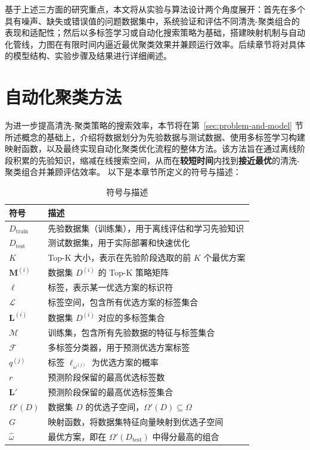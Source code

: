 \documentclass[10pt]{article} %
\numberwithin{equation}{section}
\begin{document}
基于上述三方面的研究重点，本文将从实验与算法设计两个角度展开：首先在多个具有噪声、缺失或错误值的问题数据集中，系统验证和评估不同清洗-聚类组合的表现和适配性；然后以多标签学习或自动化搜索策略为基础，搭建映射机制与自动化管线，力图在有限时间内逼近最优聚类效果并兼顾运行效率。后续章节将对具体的模型结构、实验步骤及结果进行详细阐述。


\section{自动化聚类方法}
\label{sec:autoML}

为进一步提高清洗-聚类策略的搜索效率，本节将在第~\ref{sec:problem-and-model} 节所述概念的基础上，介绍将数据划分为先验数据与测试数据、使用多标签学习构建映射函数，以及最终实现自动化聚类优化流程的整体方法。该方法旨在通过离线阶段积累的先验知识，缩减在线搜索空间，从而在\textbf{较短时间}内找到\textbf{接近最优}的清洗-聚类组合并兼顾评估效率。
以下是本章节所定义的符号与描述：

\begin{table}[ht]
\centering
\small %
\renewcommand{\arraystretch}{1.1} %
\label{tab:symbols-advanced}
\begin{tabular}{ll}
\toprule
\textbf{符号} & \textbf{描述} \\
\midrule
$D_{\text{train}}$ & 先验数据集（训练集），用于离线评估和学习先验知识 \\
$D_{\text{test}}$ & 测试数据集，用于实际部署和快速优化 \\
$K$ & Top-K 大小，表示在先验阶段选取的前 $K$ 个最优方案 \\
$\mathbf{M}^{(i)}$ & 数据集 $D^{(i)}$ 的 Top-K 策略矩阵 \\
$\ell$ & 标签，表示某一优选方案的标识符 \\
$\mathcal{L}$ & 标签空间，包含所有优选方案的标签集合 \\
$\mathbf{L}^{(i)}$ & 数据集 $D^{(i)}$ 对应的多标签集合 \\
$\mathcal{M}$ & 训练集，包含所有先验数据的特征与标签集合 \\
$\mathcal{F}$ & 多标签分类器，用于预测优选方案标签 \\
$q^{(j)}$ & 标签 $\ell_{\omega^{(j)}}$ 为优选方案的概率 \\
$r$ & 预测阶段保留的最高优选标签数 \\
$\mathbf{L}'$ & 预测阶段保留的最高优选标签集合 \\
$\Omega'(D)$ & 数据集 $D$ 的优选子空间，$\Omega'(D) \subseteq \Omega$ \\
$G$ & 映射函数，将数据集特征向量映射到优选子空间 \\
$\hat{\omega}$ & 最优方案，即在 $\Omega'(D_{\text{test}})$ 中得分最高的组合 \\
\bottomrule
\end{tabular}
\caption{符号与描述}
\end{table}
\end{document}
